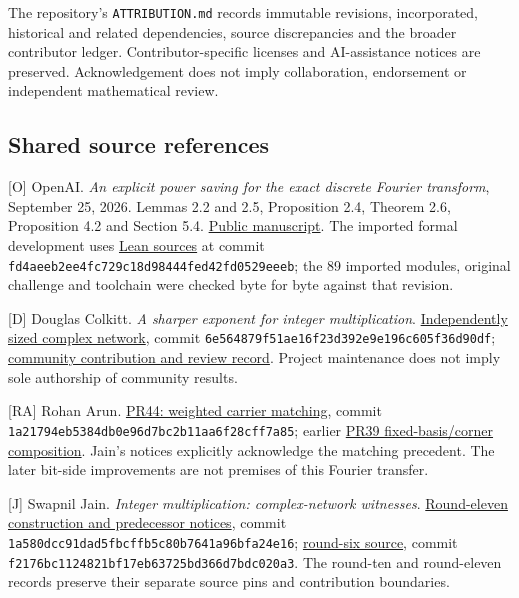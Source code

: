 \documentclass[
  11pt,
]{article}
\begin{document}
The repository's \texttt{ATTRIBUTION.md} records immutable revisions,
incorporated, historical and related dependencies, source discrepancies
and the broader contributor ledger. Contributor-specific licenses and
AI-assistance notices are preserved. Acknowledgement does not imply
collaboration, endorsement or independent mathematical review.

\subsection{Shared source references}\label{shared-source-references}

{[}O{]} OpenAI. \emph{An explicit power saving for the exact discrete
Fourier transform}, September 25, 2026. Lemmas 2.2 and 2.5, Proposition
2.4, Theorem 2.6, Proposition 4.2 and Section 5.4.
\href{https://github.com/openai/math/blob/main/preprints/An-explicit-power-saving-for-the-exact-discrete-Fourier-transform-September-25-2026/main.pdf}{Public
manuscript}. The imported formal development uses
\href{https://github.com/openai/math/tree/fd4aeeb2ee4fc729c18d98444fed42fd0529eeeb/lean}{Lean
sources} at commit \texttt{fd4aeeb2ee\allowbreak{}4fc729c18d\allowbreak{}98444fed42\allowbreak{}fd0529eeeb};
the 89 imported modules, original challenge and toolchain were checked
byte for byte against that revision.

{[}D{]} Douglas Colkitt. \emph{A sharper exponent for integer
multiplication}.
\href{https://github.com/CrocSwap/integer-mult-bounds/blob/6e564879f51ae16f23d392e9e196c605f36d90df/notes/independent-complex.tex}{Independently
sized complex network}, commit
\texttt{6e564879f5\allowbreak{}1ae16f23d3\allowbreak{}92e9e196c6\allowbreak{}05f36d90df};
\href{https://github.com/CrocSwap/integer-mult-bounds/blob/3b6b66891c0ac888521cf591fe306c6286601d4f/CONTRIBUTORS.md}{community
contribution and review record}. Project maintenance does not imply sole
authorship of community results.

{[}RA{]} Rohan Arun.
\href{https://github.com/CrocSwap/integer-mult-bounds/pull/44}{PR44:
weighted carrier matching}, commit
\texttt{1a21794eb5\allowbreak{}384db0e96d\allowbreak{}7bc2b11aa6\allowbreak{}f28cff7a85}; earlier
\href{https://github.com/CrocSwap/integer-mult-bounds/pull/39}{PR39
fixed-basis/corner composition}. Jain's notices explicitly acknowledge
the matching precedent. The later bit-side improvements are not premises
of this Fourier transfer.

{[}J{]} Swapnil Jain. \emph{Integer multiplication: complex-network
witnesses}.
\href{https://github.com/Swapnil-jain/integer-mult-kappa/tree/1a580dcc91dad5fbcffb5c80b7641a96bfa24e16}{Round-eleven
construction and predecessor notices}, commit
\texttt{1a580dcc91\allowbreak{}dad5fbcffb\allowbreak{}5c80b7641a\allowbreak{}96bfa24e16};
\href{https://github.com/Swapnil-jain/integer-mult-kappa/tree/f2176bc1124821bf17eb63725bd366d7bdc020a3}{round-six
source}, commit \texttt{f2176bc112\allowbreak{}4821bf17eb\allowbreak{}63725bd366\allowbreak{}d7bdc020a3}. The
round-ten and round-eleven records preserve their separate source pins
and contribution boundaries.
\end{document}
